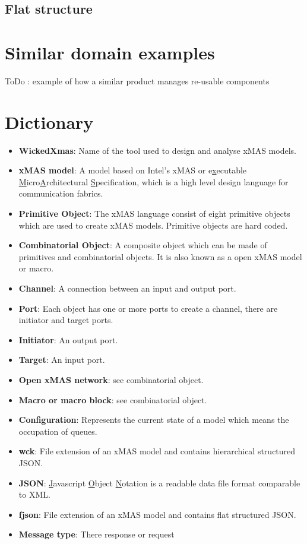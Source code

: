 \documentclass[a4paper,11pt,final]{article}
\begin{document}
\subsection{Flat structure}

\newpage
\section{Similar domain examples}
ToDo : example of how a similar product manages re-usable components 

\newpage
\section{Dictionary} 
\begin{itemize}
\item \textbf{WickedXmas}: Name of the tool used to design and analyse xMAS models.
\item \textbf{xMAS model}: A model based on Intel's xMAS or e\underline{x}ecutable \underline{M}icro\underline{A}rchitectural \underline{S}pecification, which is a high level design language for communication fabrics. 
\item \textbf{Primitive Object}: The xMAS language consist of eight primitive objects which are used to create xMAS models. Primitive objects are hard coded.
\item \textbf{Combinatorial Object}: A composite object which can be made of primitives and combinatorial objects. It is also known as a open xMAS model or macro.
\item \textbf{Channel}: A connection between an input and output port.
\item \textbf{Port}: Each object has one or more ports to create a channel, there are initiator and target ports.
\item \textbf{Initiator}: An output port.
\item \textbf{Target}: An input port.
\item \textbf{Open xMAS network}: see combinatorial object.
\item \textbf{Macro or macro block}: see combinatorial object.
\item \textbf{Configuration}: Represents the current state of a model which means the occupation of queues.
\item \textbf{wck}: File extension of an xMAS model and contains hierarchical structured JSON.
\item \textbf{JSON}: \underline{J}avascript \underline{O}bject \underline{N}otation is a readable data file format comparable to XML.
\item \textbf{fjson}: File extension of an xMAS model and contains flat structured JSON.
\item \textbf{Message type}: There response or request 

\end{itemize}
\end{document}
